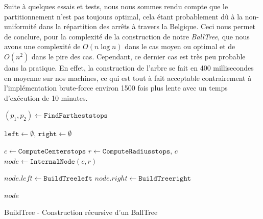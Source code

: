 \documentclass[12pt]{article}
\begin{document}
Suite à quelques essais et tests, nous nous sommes rendu compte que le partitionnement n'est pas toujours optimal, cela étant probablement dû à la non-uniformité dans la répartition des arrêts à
travers la Belgique. Ceci nous permet de conclure, pour la complexité de la construction de notre \emph{BallTree}, que nous avons une complexité de $O(n \log n)$ dans le cas moyen ou optimal et de 
$O(n^2)$ dans le pire des cas. Cependant, ce dernier cas est très peu probable dans la pratique. En effet, la construction de l'arbre se fait en 400 millisecondes en moyenne sur nos machines, ce qui 
est tout à fait acceptable contrairement à l'implémentation brute-force environ 1500 fois plus lente avec un temps d'exécution de 10 minutes.

\begin{algorithm}[H]
    \footnotesize
    \DontPrintSemicolon
    
    
    $(p_1,p_2)\gets \texttt{FindFarthest}{\texttt{stops}}$\;
    
    $\texttt{left}\gets\emptyset$, \quad $\texttt{right}\gets\emptyset$\;
    
    $c\gets \texttt{ComputeCenter}{\texttt{stops}}$\;
    $r\gets \texttt{ComputeRadius}{\texttt{stops},\,c}$\;
    $node\gets \texttt{InternalNode}(c,r)$\;
    
    $node.\mathit{left}\gets \texttt{BuildTree}{\texttt{left}}$\;
    $node.\mathit{right}\gets \texttt{BuildTree}{\texttt{right}}$\;
    
    \Return $node$\;
    \caption{BuildTree - Construction récursive d'un BallTree}
  \end{algorithm}
  
\end{document}
